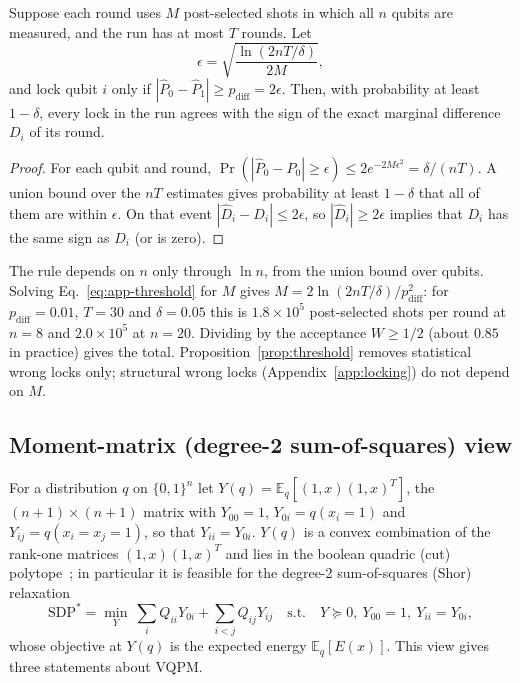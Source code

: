 \begin{proposition}
\label{prop:threshold}
Suppose each round uses $M$ post-selected shots in which all $n$ qubits are measured, and the run has at most $T$ rounds. Let
\begin{equation}
\epsilon=\sqrt{\frac{\ln(2nT/\delta)}{2M}},
\label{eq:app-threshold}
\end{equation}
and lock qubit $i$ only if $|\hat P_0-\hat P_1|\ge p_{\mathrm{diff}}=2\epsilon$. Then, with probability at least $1-\delta$, every lock in the run agrees with the sign of the exact marginal difference $D_i$ of its round.
\end{proposition}
\begin{proof}
For each qubit and round, $\Pr(|\hat P_0-P_0|\ge\epsilon)\le2e^{-2M\epsilon^2}=\delta/(nT)$. A union bound over the $nT$ estimates gives probability at least $1-\delta$ that all of them are within $\epsilon$. On that event $|\hat D_i-D_i|\le2\epsilon$, so $|\hat D_i|\ge2\epsilon$ implies that $D_i$ has the same sign as $\hat D_i$ (or is zero).
\end{proof}

The rule depends on $n$ only through $\ln n$, from the union bound over qubits. Solving Eq.~\eqref{eq:app-threshold} for $M$ gives $M=2\ln(2nT/\delta)/p_{\mathrm{diff}}^2$: for $p_{\mathrm{diff}}=0.01$, $T=30$ and $\delta=0.05$ this is $1.8\times10^5$ post-selected shots per round at $n=8$ and $2.0\times10^5$ at $n=20$. Dividing by the acceptance $W\ge1/2$ (about $0.85$ in practice) gives the total. Proposition~\ref{prop:threshold} removes statistical wrong locks only; structural wrong locks (Appendix~\ref{app:locking}) do not depend on $M$.

\subsection{Moment-matrix (degree-2 sum-of-squares) view}
\label{app:sos}
For a distribution $q$ on $\{0,1\}^n$ let $Y(q)=\mathbb{E}_q[(1,x)(1,x)^{T}]$, the $(n+1)\times(n+1)$ matrix with $Y_{00}=1$, $Y_{0i}=q(x_i=1)$ and $Y_{ij}=q(x_i=x_j=1)$, so that $Y_{ii}=Y_{0i}$. $Y(q)$ is a convex combination of the rank-one matrices $(1,x)(1,x)^T$ and lies in the boolean quadric (cut) polytope~\cite{deza1997geometry}; in particular it is feasible for the degree-2 sum-of-squares (Shor) relaxation~\cite{shor1987quadratic,lasserre2001global}
\begin{equation}
\mathrm{SDP}^*=\min_Y\ \sum_iQ_{ii}Y_{0i}+\sum_{i<j}Q_{ij}Y_{ij}\quad\text{s.t.}\quad Y\succeq0,\ Y_{00}=1,\ Y_{ii}=Y_{0i},
\label{eq:app-shor}
\end{equation}
whose objective at $Y(q)$ is the expected energy $\mathbb{E}_q[E(x)]$. This view gives three statements about VQPM.

